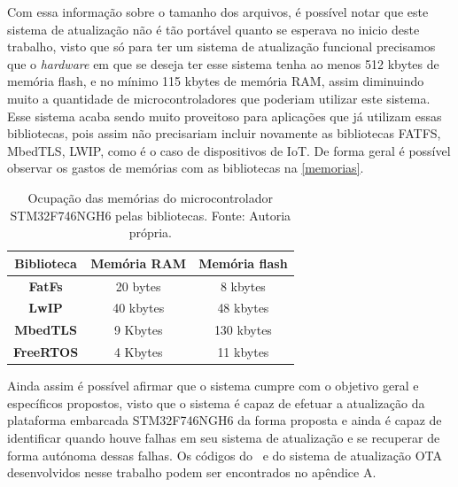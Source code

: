 Com essa informação sobre o tamanho dos arquivos, é possível notar que este sistema de atualização não é tão portável quanto se esperava no inicio deste trabalho, visto que só para ter um sistema de atualização funcional precisamos que o \textit{hardware} em que se deseja ter esse sistema tenha ao menos 512 kbytes de memória flash, e no mínimo 115 kbytes de memória RAM, assim diminuindo muito a quantidade de microcontroladores que poderiam utilizar este sistema. Esse sistema acaba sendo muito proveitoso para aplicações que já utilizam essas bibliotecas, pois assim não precisariam incluir novamente as bibliotecas FATFS, MbedTLS, LWIP, como é o caso de dispositivos de IoT. De forma geral é possível observar os gastos de memórias com as bibliotecas na \autoref{memorias}. \newline


\begin{table}[H]
    \scriptsize
    \centering
    \begin{tabular}{|c|c|c|}
    \hline
    \textbf{Biblioteca} & \textbf{Memória RAM} & \textbf{Memória flash} \\ \hline
    \textbf{FatFs}      & 20 bytes             & 8 kbytes               \\ \hline
    \textbf{LwIP}       & 40 kbytes            & 48 kbytes              \\ \hline
    \textbf{MbedTLS}    & 9 Kbytes             & 130 kbytes             \\ \hline
    \textbf{FreeRTOS}    & 4 Kbytes             & 11 kbytes             \\ \hline
    \end{tabular}
    \caption{Ocupação das memórias do microcontrolador STM32F746NGH6 pelas bibliotecas. \newline Fonte: Autoria própria.}
    \label{memorias}
    \end{table}

Ainda assim é possível afirmar que o sistema cumpre com o objetivo geral e específicos propostos, visto que o sistema é capaz de efetuar a atualização da plataforma embarcada STM32F746NGH6 da forma proposta e ainda é capaz de identificar quando houve falhas em seu sistema de atualização e se recuperar de forma autónoma dessas falhas. Os códigos do \bootloader\ e do sistema de atualização OTA desenvolvidos nesse trabalho podem ser encontrados no apêndice A.
